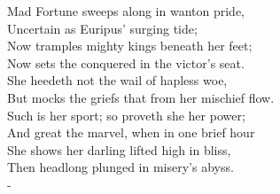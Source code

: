 \documentclass[12pt]{book}
\newenvironment{ipoem}[1]%
  {\setcounter{poemindentevery}{#1}\begin{poem}\small}%
  {\end{poem}\setcounter{poemindentevery}{0}}
\begin{document}
\begin{ipoem}{0}
    Mad Fortune sweeps along in wanton pride, \\
    Uncertain as Euripus' surging tide; \\
    Now tramples mighty kings beneath her feet; \\
    Now sets the conquered in the victor's seat. \\
    She heedeth not the wail of hapless woe, \\
    But mocks the griefs that from her mischief flow. \\
    Such is her sport; so proveth she her power; \\
    And great the marvel, when in one brief hour \\
    She shows her darling lifted high in bliss, \\
    Then headlong plunged in misery's abyss. \\-
\end{ipoem}
\end{document}
